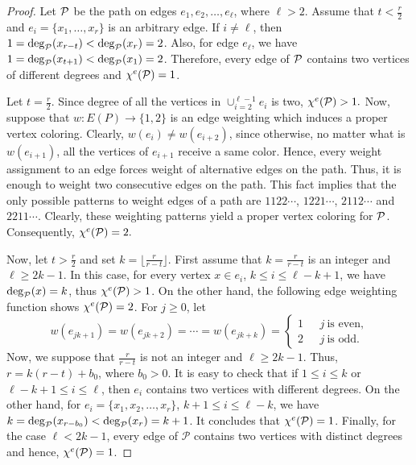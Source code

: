 \documentclass[12pt,a4paper]{article}
\begin{document}
\begin{proof}
	Let $ \cal P $ be the path on edges $ e_1, e_2, \ldots, e_{\ell} $, where $ \ell>2 $.
	Assume that $ t<\frac{r}{2} $ and  $ e_i=\{x_1,\ldots, x_r\} $  is an arbitrary edge. If $i\neq \ell$, then $ 1=\deg_{\cal P}(x_{r-t})<\deg_{\cal P}(x_r)=2 $. Also, for edge $ e_\ell $, we have $ 1=\deg_{\cal P}(x_{t+1})<\deg_{\cal P}(x_1)=2 $. Therefore, every edge of $ \cal P $ contains two vertices of different degrees and $ \chi^{e}({\cal P})=1 $.
	
	Let $ t=\frac{r}{2} $. Since degree of all the vertices in $ \cup^{\ell-1}_{i=2} e_i $ is two, $ \chi^e({\cal P})>1.$
	Now, suppose that $ w:E(P)\rightarrow\{1,2\} $ is an edge weighting which induces a proper vertex coloring.
	Clearly, $ w(e_i)\neq w(e_{i+2}) $, since otherwise, no matter what is $ w(e_{i+1}) $, all the vertices of $ e_{i+1} $ receive a same color.
	Hence, every weight assignment to an edge forces weight of alternative edges on the path. Thus, it is enough to weight two consecutive edges on the path.
	This fact implies that the only possible patterns to weight edges of a path are $ 1122\cdots $, $ 1221\cdots $, $ 2112\cdots $ and $ 2211\cdots $. Clearly, these weighting patterns yield a proper vertex coloring for $ \cal P $.  Consequently, $ \chi^e({\cal P})=2.$
	
	Now, let $ t>\frac{r}{2} $ and set $ k=\lfloor\frac{r}{r-t}\rfloor $. First assume that $ k=\frac{r}{r-t} $ is an integer and  $ \ell\geq 2k-1 $. In this case, for every vertex $ x\in e_{i} $, $k\leq i\leq \ell-k+1 $,  we have $ \deg_{\cal P}(x)=k $, thus  $  \chi^e({\cal P})>1  $. On the other hand, the following edge weighting function shows $  \chi^e({\cal P})=2  $. For $ j\geq0 $, let
	\begin{equation*}
	w(e_{jk+1})=w(e_{jk+2})=\cdots=w(e_{jk+k})=
	\left\{
	\begin{array}{cl}
	1 & \ \ \ j \ \text{is even,}  \\
	2 & \ \ \ j \ \text{is odd.}
	\end{array}
	\right.
	\end{equation*}
	Now, we suppose that $\frac{r}{r-t} $ is not an integer and $ \ell\geq 2k-1 $. Thus, $ r=k(r-t)+b_0 $, where $ b_0>0 $.
	It is easy to check that if $ 1\leq i\leq k $ or $ \ell-k+1\leq i\leq\ell $, then $ e_i $ contains two vertices with different degrees.
	On the other hand, for $ e_i=\{x_1, x_2, \ldots, x_r\} $, $ k+1\leq i\leq \ell-k  $,  we have $ k=\deg_{\cal P}(x_{r-b_0})<\deg_{\cal P}(x_r)=k+1 $.
	It concludes that
	$  \chi^e({\cal P})=1  $. Finally, for the case $ \ell<2k -1 $,  every edge of $\mathcal{P}$ contains two vertices with distinct degrees and hence, $ \chi^e({\cal P})=1  $.
\end{proof}
\end{document}
